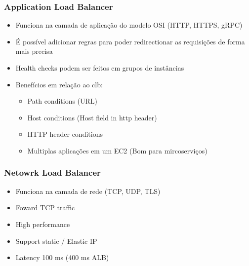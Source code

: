\begin{frame}
	\frametitle{Application Load Balancer}
	\begin{itemize}
		\item Funciona na camada de aplicação do modelo OSI (HTTP, HTTPS, gRPC)
		\item É possível adicionar regras para poder redirectionar as requisições de forma mais precisa
		\item Health checks podem ser feitos em grupos de instâncias
		\item Benefícios em relação ao clb:
			\begin{itemize}
				\item Path conditions (URL)
				\item Host conditions (Host field in http header)
				\item HTTP header conditions
				\item Multiplas aplicações em um EC2 (Bom para mircoserviços)
			\end{itemize}
	\end{itemize}
\end{frame}

\begin{frame}
	\frametitle{Netowrk Load Balancer}
	\begin{itemize}
		\item Funciona na camada de rede (TCP, UDP, TLS)
		\item Foward TCP traffic
		\item High performance
		\item Support static / Elastic IP
		\item Latency 100 ms (400 ms ALB)
	\end{itemize}
\end{frame}

